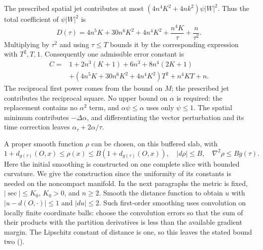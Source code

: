 The prescribed spatial jet contributes at most
$(4n^4K^2+4nk^2)\psi|W|^2$.  Thus the total coefficient of
$\psi|W|^2$ is
\[
 D(\tau)=4n^5K+30n^6K^2+4n^4K^2+
                   \frac{n^4K}{\tau}+\frac n{\tau^2}.
\]
Multiplying by $\tau^2$ and using $\tau\leq T$ bounds it by
the corresponding expression with $T^2,T,1$.  Consequently one
admissible error constant is
\[
\begin{split}
 C={}&1+2n^3(K+1)+6n^3+8n^4(2K+1)\\
 &+(4n^5K+30n^6K^2+4n^4K^2)T^2+n^4KT+n.
\end{split}
\]
The reciprocal first power comes from the bound on $M$; the
prescribed jet contributes the reciprocal square.  No upper bound
on $\alpha$ is required: the replacement contains no $\alpha^2$
term, and $\alpha\psi\leq\alpha$ uses only $\psi\leq1$.
The spatial minimum contributes
$-\Delta\alpha$, and differentiating the vector perturbation and its
time correction leaves $\alpha_\tau+2\alpha/\tau$.

A proper smooth function $\rho$ can be chosen, on this buffered slab,
with
\[
 1+d_{g(\tau)}(O,x)\leq\rho(x)\leq B(1+d_{g(\tau)}(O,x)),\quad
 |d\rho|\leq B,\quad \nabla^2\rho\leq Bg(\tau).
\]
Here the initial smoothing is constructed on one complete slice with
bounded curvature.  We give the construction since the uniformity of
its constants is needed on the noncompact manifold.  In the next
paragraphs the metric is fixed, $|\sec|\leq K_0$, $K_0>0$, and
$n\geq2$.  Smooth the distance function to obtain $u$ with
$|u-d(O,\cdot)|\leq1$ and $|du|\leq2$.  Such first-order smoothing
uses convolution on locally finite coordinate balls: choose the
convolution errors so that the sum of their products with the
partition derivatives is less than the available gradient margin.
The Lipschitz constant of distance is one, so this leaves the stated
bound two (\cite[Proposition 26.49, equation (26.131), p.~378]{ChowEtAl2010}).


